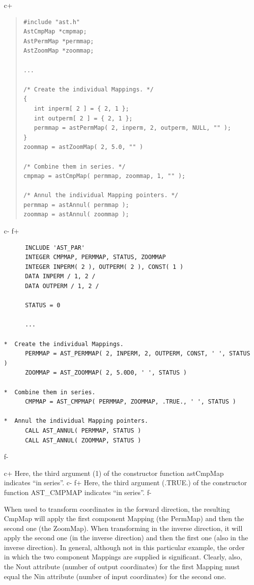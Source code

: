 \documentclass[twoside,11pt]{article}
\begin{document}
c+
\begin{quote}
\small
\begin{verbatim}
#include "ast.h"
AstCmpMap *cmpmap;
AstPermMap *permmap;
AstZoomMap *zoommap;

...

/* Create the individual Mappings. */
{
   int inperm[ 2 ] = { 2, 1 };
   int outperm[ 2 ] = { 2, 1 };
   permmap = astPermMap( 2, inperm, 2, outperm, NULL, "" );
}
zoommap = astZoomMap( 2, 5.0, "" )

/* Combine them in series. */
cmpmap = astCmpMap( permmap, zoommap, 1, "" );

/* Annul the individual Mapping pointers. */
permmap = astAnnul( permmap );
zoommap = astAnnul( zoommap );
\end{verbatim}
\normalsize
\end{quote}
c-
f+
\small
\begin{verbatim}
      INCLUDE 'AST_PAR'
      INTEGER CMPMAP, PERMMAP, STATUS, ZOOMMAP
      INTEGER INPERM( 2 ), OUTPERM( 2 ), CONST( 1 )
      DATA INPERM / 1, 2 /
      DATA OUTPERM / 1, 2 /

      STATUS = 0

      ...

*  Create the individual Mappings.
      PERMMAP = AST_PERMMAP( 2, INPERM, 2, OUTPERM, CONST, ' ', STATUS )
      ZOOMMAP = AST_ZOOMMAP( 2, 5.0D0, ' ', STATUS )

*  Combine them in series.
      CMPMAP = AST_CMPMAP( PERMMAP, ZOOMMAP, .TRUE., ' ', STATUS )

*  Annul the individual Mapping pointers.
      CALL AST_ANNUL( PERMMAP, STATUS )
      CALL AST_ANNUL( ZOOMMAP, STATUS )
\end{verbatim}
\normalsize
f-

c+
Here, the third argument (1) of the constructor function astCmpMap
indicates ``in series''.
c-
f+
Here, the third argument (.TRUE.) of the constructor function
AST\_CMPMAP indicates ``in series''.
f-

When used to transform coordinates in the forward direction, the
resulting CmpMap will apply the first component Mapping (the PermMap)
and then the second one (the ZoomMap). When transforming in the
inverse direction, it will apply the second one (in the inverse
direction) and then the first one (also in the inverse direction).  In
general, although not in this particular example, the order in which
the two component Mappings are supplied is significant. Clearly, also,
the Nout attribute (number of output coordinates) for the first
Mapping must equal the Nin attribute (number of input coordinates) for
the second one.
\end{document}
